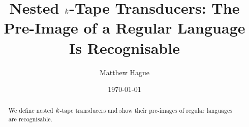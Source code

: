 \documentclass{article}
\title{Nested $k$-Tape Transducers: The Pre-Image of a Regular Language Is Recognisable}
\author{Matthew Hague}
\date{\today}
\begin{document}
\maketitle

\begin{abstract}
    We define nested $k$-tape transducers and show their pre-images of regular languages are recognisable.
\end{abstract}




\end{document}
